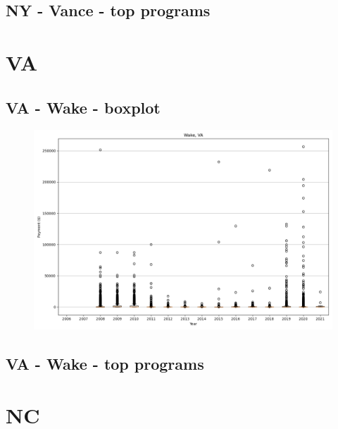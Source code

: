 \subsection*{NY - Vance - top programs}

\newpage
\section*{VA}
\subsection*{VA - Wake - boxplot}
\begin{figure}[h]
\centering
\includegraphics[width=7in]{../output/boxplots/counties/Wake-VA_boxplot.png}
\end{figure}


\subsection*{VA - Wake - top programs}

\newpage
\section*{NC}
